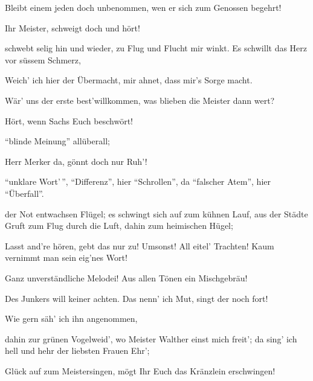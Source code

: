 \begin{drama}


Bleibt einem jeden doch unbenommen,
wen er sich zum Genossen begehrt!

\Sachsspeaks
Ihr Meister, schweigt doch und hört!

\Waltherspeaks
schwebt selig hin und wieder,
zu Flug und Flucht mir winkt.
Es schwillt das Herz
vor süssem Schmerz,

\Pognerspeaks
Weich' ich hier der Übermacht,
mir ahnet, dass mir's Sorge macht.


Wär' uns der erste best'willkommen,
was blieben die Meister dann wert?

\Sachsspeaks
{}

Hört, wenn Sachs Euch beschwört!

\Beckmesserspeaks
``blinde Meinung'' allüberall;

\Sachsspeaks
Herr Merker da, gönnt doch nur Ruh'!

\Beckmesserspeaks
``unklare Wort'\,'', ``Differenz'',
hier ``Schrollen'',
da ``falscher Atem'', hier ``Überfall''.

\Waltherspeaks
der Not entwachsen Flügel;
es schwingt sich auf
zum kühnen Lauf,
aus der Städte Gruft
zum Flug durch die Luft,
dahin zum heimischen Hügel;

\Sachsspeaks
Lasst and're hören, gebt das nur zu!
Umsonst! All eitel' Trachten!
Kaum vernimmt man sein eig'nes Wort!

\Beckmesserspeaks
Ganz unverständliche Melodei!
Aus allen Tönen ein Mischgebräu!

\Sachsspeaks
Des Junkers will keiner achten.
Das nenn' ich Mut, singt der noch fort!

\Pognerspeaks
Wie gern säh' ich ihn angenommen,

\Waltherspeaks
dahin zur grünen Vogelweid',
wo Meister Walther einst mich freit';
da sing' ich hell und hehr
der liebsten Frauen Ehr';


Glück auf zum Meistersingen,
mögt Ihr Euch das Kränzlein erschwingen!




\end{drama}
